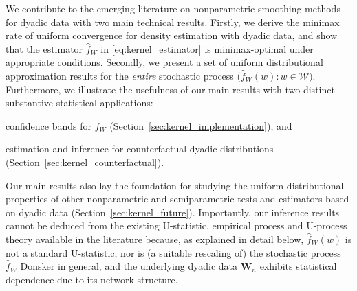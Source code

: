 \documentclass[11pt,lof]{puthesis}
\newcommand{\bW}{\ensuremath{\mathbf{W}}}
\newcommand{\cW}{\ensuremath{\mathcal{W}}}
\theoremstyle{break}
\theoremstyle{proof}
\begin{document}
We contribute to the emerging literature on nonparametric smoothing methods for
dyadic data with two main technical results. Firstly, we derive the minimax
rate of uniform convergence for density estimation with dyadic data, and show
that the estimator $\hat{f}_W$ in \eqref{eq:kernel_estimator} is
minimax-optimal under appropriate conditions. Secondly, we present a set of
uniform distributional approximation results for the \emph{entire} stochastic
process $\big(\hat{f}_W(w):w\in\cW\big)$. Furthermore, we illustrate the
usefulness of our main results with two distinct substantive statistical
applications:
%
\begin{inlineroman}
\item
confidence bands for $f_W$ (Section~\ref{sec:kernel_implementation}), and
\item
estimation and inference for counterfactual
dyadic distributions (Section~\ref{sec:kernel_counterfactual}).
\end{inlineroman}
%
Our main results also lay the foundation for studying the uniform
distributional properties of other nonparametric and semiparametric tests and
estimators based on dyadic data (Section~\ref{sec:kernel_future}). Importantly,
our
inference results cannot be deduced from the existing U-statistic, empirical
process and U-process theory available in the literature
\citep{van1996weak,gine2021mathematical} because, as explained in detail below,
$\hat{f}_W(w)$ is not a standard U-statistic, nor is
(a suitable rescaling of) the stochastic process
$\hat{f}_W$ Donsker in general, and the underlying dyadic data $\bW_n$ exhibits
statistical dependence due to its network structure.
\end{document}
